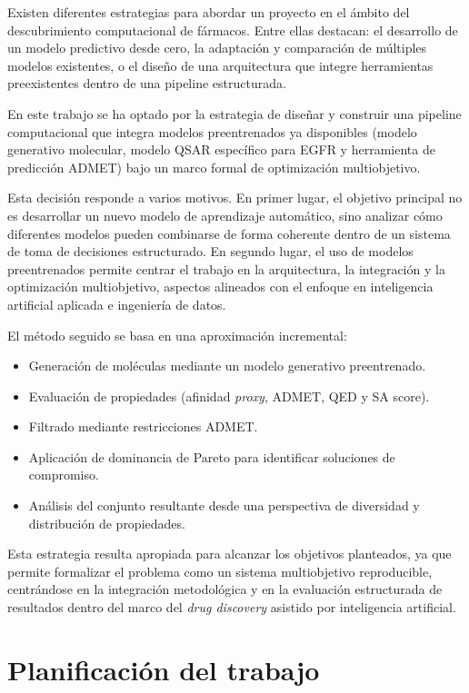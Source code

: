 \documentclass[IB]{TFUOC}%
\begin{document}
Existen diferentes estrategias para abordar un proyecto en el ámbito del descubrimiento computacional de fármacos. Entre ellas destacan: el desarrollo de un modelo predictivo desde cero, la adaptación y comparación de múltiples modelos existentes, o el diseño de una arquitectura que integre herramientas preexistentes dentro de una pipeline estructurada.

En este trabajo se ha optado por la estrategia de diseñar y construir una pipeline computacional que integra modelos preentrenados ya disponibles (modelo generativo molecular, modelo QSAR específico para EGFR y herramienta de predicción ADMET) bajo un marco formal de optimización multiobjetivo.

Esta decisión responde a varios motivos. En primer lugar, el objetivo principal no es desarrollar un nuevo modelo de aprendizaje automático, sino analizar cómo diferentes modelos pueden combinarse de forma coherente dentro de un sistema de toma de decisiones estructurado. En segundo lugar, el uso de modelos preentrenados permite centrar el trabajo en la arquitectura, la integración y la optimización multiobjetivo, aspectos alineados con el enfoque en inteligencia artificial aplicada e ingeniería de datos.

El método seguido se basa en una aproximación incremental:

\begin{itemize}
    \item Generación de moléculas mediante un modelo generativo preentrenado.
    \item Evaluación de propiedades (afinidad \textit{proxy}, ADMET, QED y SA score).
    \item Filtrado mediante restricciones ADMET.
    \item Aplicación de dominancia de Pareto para identificar soluciones de compromiso.
    \item Análisis del conjunto resultante desde una perspectiva de diversidad y distribución de propiedades.
\end{itemize}

Esta estrategia resulta apropiada para alcanzar los objetivos planteados, ya que permite formalizar el problema como un sistema multiobjetivo reproducible, centrándose en la integración metodológica y en la evaluación estructurada de resultados dentro del marco del \textit{drug discovery} asistido por inteligencia artificial.

\section{Planificación del trabajo}
\end{document}
